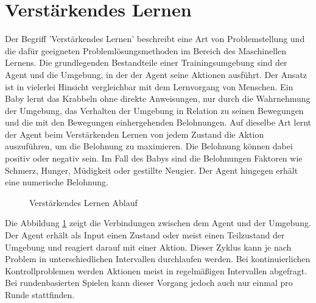 {\section{Verstärkendes Lernen}}
\label{sec:rl}
Der Begriff 'Verstärkendes Lernen' beschreibt eine Art von Problemstellung und die dafür geeigneten Problemlösungsmethoden im Bereich des Maschinellen Lernens. Die grundlegenden Bestandteile einer Trainingsumgebung sind der Agent und die Umgebung, in der der Agent seine Aktionen ausführt. Der Ansatz ist in vielerlei Hinsicht vergleichbar mit dem Lernvorgang von Menschen. Ein Baby lernt das Krabbeln ohne direkte Anweisungen, nur durch die Wahrnehmung der Umgebung, das Verhalten der Umgebung in Relation zu seinen Bewegungen und die mit den Bewegungen einhergehenden Belohnungen. Auf dieselbe Art lernt der Agent beim Verstärkenden Lernen von jedem Zustand die Aktion auszuführen, um die Belohnung zu maximieren. Die Belohnung können dabei positiv oder negativ sein. Im Fall des Babys sind die Belohnungen Faktoren wie Schmerz, Hunger, Müdigkeit oder gestillte Neugier. Der Agent hingegen erhält eine numerische Belohnung.\cite{sutton2018reinforcement}

\begin{figure}[H]
  \centering
  \caption{Verstärkendes Lernen Ablauf}
  \label{fig:vl_ablauf}
\end{figure}

Die Abbildung \ref{fig:vl_ablauf} zeigt die Verbindungen zwischen dem Agent und der Umgebung. Der Agent erhält als Input einen Zustand oder meist einen Teilzustand der Umgebung und reagiert darauf mit einer Aktion. Dieser Zyklus kann je nach Problem in unterschiedlichen Intervallen durchlaufen werden. Bei kontinuierlichen Kontrollproblemen werden Aktionen meist in regelmäßigen Intervallen abgefragt. Bei rundenbasierten Spielen kann dieser Vorgang jedoch auch nur einmal pro Runde stattfinden.